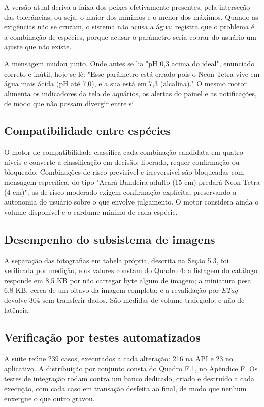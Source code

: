 \documentclass[12pt,oneside,a4paper,brazilian]{abntex2}
\begin{document}
A versão atual deriva a faixa dos peixes efetivamente presentes, pela interseção das tolerâncias, ou seja, o maior dos mínimos e o menor dos máximos. Quando as exigências não se cruzam, o sistema não acusa a água: registra que o problema é a combinação de espécies, porque acusar o parâmetro seria cobrar do usuário um ajuste que não existe.

A mensagem mudou junto. Onde antes se lia "pH 0,3 acima do ideal", enunciado correto e inútil, hoje se lê: "Esse parâmetro está errado pois o Neon Tetra vive em água mais ácida (pH até 7,0), e a sua está em 7,3 (alcalina)." O mesmo motor alimenta os indicadores da tela de aquários, os alertas do painel e as notificações, de modo que não possam divergir entre si.


\subsection{Compatibilidade entre espécies}
O motor de compatibilidade classifica cada combinação candidata em quatro níveis e converte a classificação em decisão: liberado, requer confirmação ou bloqueado. Combinações de risco previsível e irreversível são bloqueadas com mensagem específica, do tipo "Acará Bandeira adulto (15 cm) predará Neon Tetra (4 cm)"; as de risco moderado exigem confirmação explícita, preservando a autonomia do usuário sobre o que envolve julgamento. O motor considera ainda o volume disponível e o cardume mínimo de cada espécie.


\subsection{Desempenho do subsistema de imagens}
A separação das fotografias em tabela própria, descrita na Seção 5.3, foi verificada por medição, e os valores constam do Quadro 4: a listagem do catálogo responde em 8,5 KB por não carregar byte algum de imagem; a miniatura pesa 6,8 KB, cerca de um oitavo da imagem completa; e a revalidação por \textit{ETag} devolve 304 sem transferir dados. São medidas de volume trafegado, e não de latência.


\subsection{Verificação por testes automatizados}
A suíte reúne 239 casos, executados a cada alteração: 216 na API e 23 no aplicativo. A distribuição por conjunto consta do Quadro F.1, no Apêndice F. Os testes de integração rodam contra um banco dedicado, criado e destruído a cada execução, com cada caso em transação desfeita ao final, de modo que nenhum enxergue o que outro gravou.
\end{document}

